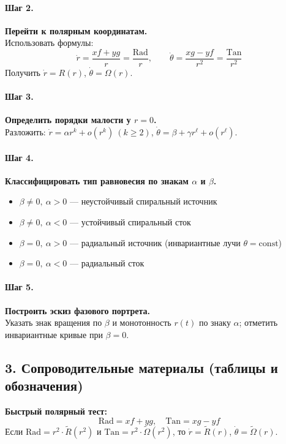 \paragraph{Шаг 2.} \textbf{Перейти к полярным координатам.}\\
Использовать формулы:
\[
\dot r=\frac{x f+y g}{r}=\frac{\text{Rad}}{r},\qquad
\dot\theta=\frac{x g-y f}{r^{2}}=\frac{\text{Tan}}{r^{2}}
\]
Получить \(\dot r=R(r)\), \(\dot\theta=\Omega(r)\).

\paragraph{Шаг 3.} \textbf{Определить порядки малости у \(r=0\).}\\
Разложить: \(\dot r=\alpha r^{k}+o(r^{k})\ (k\ge 2)\), \(\dot\theta=\beta+\gamma r^{\ell}+o(r^{\ell})\).

\paragraph{Шаг 4.} \textbf{Классифицировать тип равновесия по знакам \(\alpha\) и \(\beta\).}\\
\begin{itemize}
\item \(\beta\ne 0,\ \alpha>0\) — неустойчивый спиральный источник
\item \(\beta\ne 0,\ \alpha<0\) — устойчивый спиральный сток
\item \(\beta=0,\ \alpha>0\) — радиальный источник (инвариантные лучи \(\theta=\mathrm{const}\))
\item \(\beta=0,\ \alpha<0\) — радиальный сток
\end{itemize}

\paragraph{Шаг 5.} \textbf{Построить эскиз фазового портрета.}\\
Указать знак вращения по \(\beta\) и монотонность \(r(t)\) по знаку \(\alpha\); отметить инвариантные кривые при \(\beta=0\).

\subsection*{3. Сопроводительные материалы (таблицы и обозначения)}

\textbf{Быстрый полярный тест:}
\[
\text{Rad}=x f+y g,\quad \text{Tan}=x g-y f
\]
Если \(\text{Rad}=r^{2}\cdot \tilde R(r^{2})\) и \(\text{Tan}=r^{2}\cdot \tilde \Omega(r^{2})\), то
\(\dot r=\tilde R(r)\), \(\dot\theta=\tilde \Omega(r)\).

